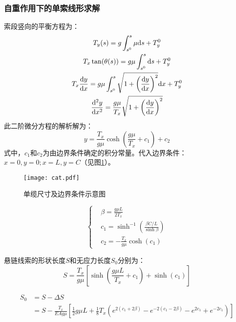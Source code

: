 \subsubsection{自重作用下的单索线形求解}
索段竖向的平衡方程为：
\begin{gather}
	T_y(s) = g \int_{s^0}^{s} \mu \mathrm{d}s + T_y^0 \notag \\
	T_x \tan(\theta(s)) = g \mu \int_{s^0}^{s} \mathrm{d}s + T_y^0 \notag \\
	T_x \frac{\mathrm{d} y}{\mathrm{d} x} = g \mu \int_{s^0}^{s} \sqrt{1+\left(\frac{\mathrm{d} y}{\mathrm{d} x}\right)^2} \mathrm{d}x + T_y^0 \notag \\
	\frac{\mathrm{d}^2 y}{\mathrm{d} x^2} = \frac{g \mu}{T_x} \sqrt{1+\left(\frac{\mathrm{d} y}{\mathrm{d} x}\right)^2}
\end{gather}
此二阶微分方程的解析解为：
\begin{equation}
	y = \frac{T_x}{g \mu} \cosh \left( \frac{g \mu}{T_x} + c_1 \right)+c_2
\end{equation}
式中，$c_1$和$c_2$为由边界条件确定的积分常量。代入边界条件：$x=0,y=0;x=L,y=C$（见图\ref{fig:cat}）。

\begin{figure}[!htpb]
	\centering
	\texttt{[image: cat.pdf]}
	\caption{单缆尺寸及边界条件示意图}
	\label{fig:cat}
\end{figure}

\begin{equation}
	\left \{
	\begin{aligned}
		  & \beta = \frac{g \mu L}{2 T_x}                                \\
		  & c_1 = \sinh^{-1}\left(\frac{\beta C / L}{\sinh \beta}\right) \\
		  & c_2 = -\frac{T_x}{g \mu} \cosh(c_1)                          
	\end{aligned}
	\right.
\end{equation}

悬链线索的形状长度$S$和无应力长度$S_0$分别为：
\begin{equation}
	S = \frac{T_x}{g\mu}\left[\sinh\left(\frac{g \mu L}{T_x}+c_1\right)+\sinh(c_1)\right]
\end{equation}

\begin{equation}
	\begin{split}
		S_0 &= S-\Delta S \\
		&= S - \frac{T_x}{EA g \mu }\left[ \frac{1}{2} g \mu L + \frac{1}{8} T_x \left( e^{2(c_1+2\beta)} - e^{-2(c_1-2\beta)} -e^{2c_1} + e^{-2c_1} \right) \right]
	\end{split}
\end{equation}

